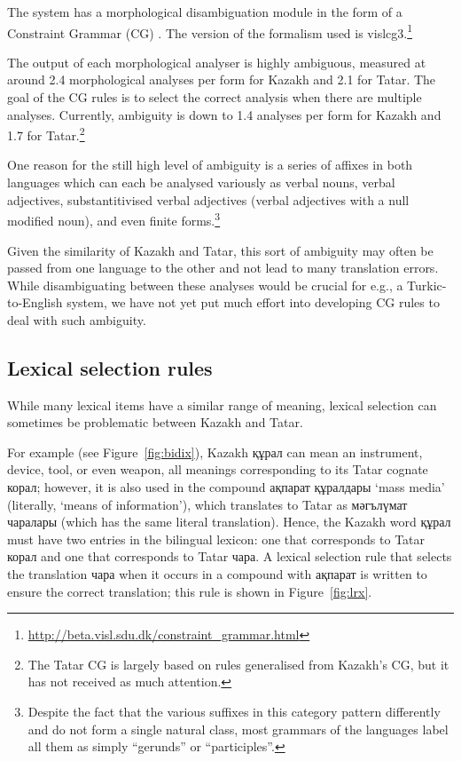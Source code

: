 \documentclass[a4paper,11pt]{article}
\newcommand{\eng}[1]{`#1'}
\begin{document}
The system has a morphological disambiguation module in the form of a 
Constraint Grammar (CG) \citep{karlsson95}. The version of the formalism used is vislcg3.\footnote{\url{http://beta.visl.sdu.dk/constraint_grammar.html}}


The output of each morphological analyser is highly ambiguous, measured at around 2.4 morphological analyses per form for Kazakh and 2.1 for Tatar.  The goal of the CG rules is to select the correct analysis when there are multiple analyses.  Currently, ambiguity is down to 1.4 analyses per form for Kazakh and 1.7 for Tatar.\footnote{The Tatar CG is largely based on rules generalised from Kazakh's CG, but it has not received as much attention.}

One reason for the still high level of ambiguity is a series of affixes in both languages which can each be analysed variously as verbal nouns, verbal adjectives, substantitivised verbal adjectives (verbal adjectives with a null modified noun), and even finite forms.\footnote{Despite the fact that the various suffixes in this category pattern differently and do not form a single natural class, most grammars of the languages label all them as simply ``gerunds'' or ``participles''.}

Given the similarity of Kazakh and Tatar, this sort of ambiguity may often be passed from one language to the other and not lead to many translation errors.  While disambiguating between these analyses would be crucial for e.g., a Turkic-to-English system, we have not yet put much effort into developing CG rules to deal with such ambiguity.

  

\subsection{Lexical selection rules}

While many lexical items have a similar range of meaning, lexical selection can sometimes be problematic between Kazakh and Tatar.

For example (see Figure~\ref{fig:bidix}), Kazakh құрал can mean an instrument, device, tool, or even weapon, all 
meanings corresponding to its Tatar cognate корал; however, it is also used in the 
compound ақпарат құралдары \eng{mass media} (literally, \eng{means of information}), which translates 
to Tatar as мәгълүмат чаралары (which has the same literal translation).  Hence, the Kazakh word құрал must have 
two entries in the bilingual lexicon: one that corresponds to Tatar корал and one that corresponds 
to Tatar чара.  A lexical selection rule that selects the translation чара when it occurs in a compound with ақпарат is written to ensure the correct translation; this rule is shown in Figure~\ref{fig:lrx}.
\end{document}
